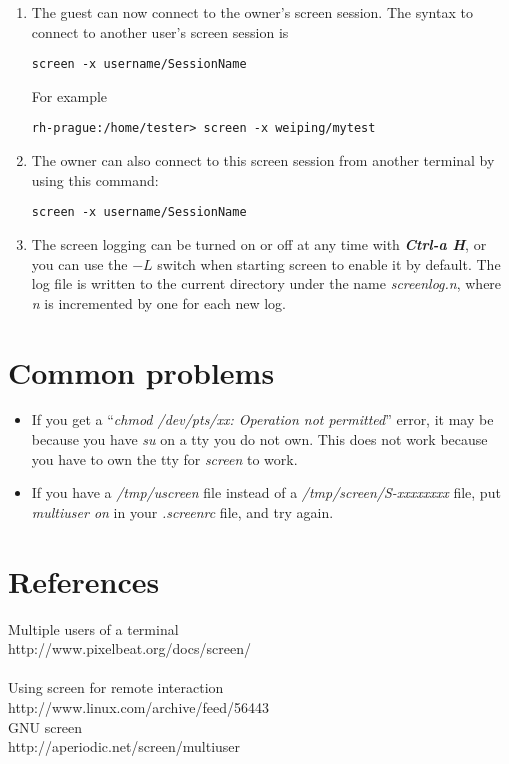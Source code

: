 \documentclass[11pt]{article}
\begin{document}
\begin{enumerate}
	\item	The guest can now connect to the owner's screen session.  The syntax to connect to another user's screen session is \begin{verbatim}screen -x username/SessionName\end{verbatim}
	For example
\begin{verbatim}
rh-prague:/home/tester> screen -x weiping/mytest
\end{verbatim}


	\item The owner can also connect to this screen session from another terminal by using this command:
	\begin{verbatim}screen -x username/SessionName\end{verbatim}
	
	\item The screen logging can be turned on or off at any time with \textbf{\textit{Ctrl-a H}}, or you can use the $-L$ switch when starting screen to enable it by default. The log file is written to the current directory under the name \textit{screenlog.n}, where \textit{n} is incremented by one for each new log.
		
\end{enumerate}

\section{Common problems}
\begin{itemize}
	\item If you get a ``\textit{chmod /dev/pts/xx: Operation not permitted}'' error, it may be because you have \textit{su} on a tty you do not own. This does not work because you have to own the tty for \textit{screen} to work.
	\item If you have a \textit{/tmp/uscreen} file instead of a \textit{/tmp/screen/S-xxxxxxxx} file, put \textit{multiuser on} in your \textit{.screenrc} file, and try again.
\end{itemize}
\section{References}
Multiple users of a terminal\\
http://www.pixelbeat.org/docs/screen/\\ \\
%
Using screen for remote interaction\\
http://www.linux.com/archive/feed/56443\\
%
GNU screen\\
http://aperiodic.net/screen/multiuser
\end{document}
